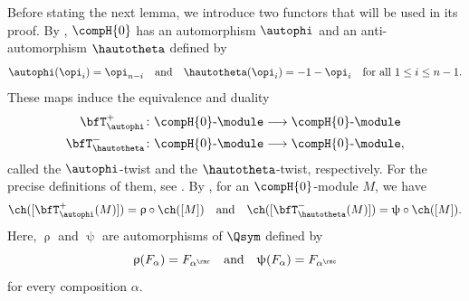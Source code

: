 \documentclass[12pt, reqno]{amsart}
\theoremstyle{plain}
\theoremstyle{definition}
\numberwithin{equation}{section}
\numberwithin{figure}{section}
\numberwithin{table}{section}
\begin{document}
Before stating the next lemma,
we introduce two functors that will be used in its proof.
By \cite[Proposition~3.2]{05Fayers}, $\compH{0}$ has an automorphism
$\autophi$ and an anti-automorphism $\hautotheta$ defined by
\[
\autophi(\opi_i)=\opi_{n-i}
\quad\text{and}\quad
\hautotheta(\opi_i)=-1-\opi_i
\quad\text{for all $1\leq i\leq n-1$}.
\]
These maps induce the equivalence and duality 
\begin{align*}
\bfT_{\autophi}^{+}
& \colon
\compH{0}\text{-}\module\longrightarrow\compH{0}\text{-}\module\\
\bfT_{\hautotheta}^{-}
&\colon
\compH{0}\text{-}\module\longrightarrow\compH{0}\text{-}\module,
\end{align*}
called the $\autophi$-twist and the $\hautotheta$-twist, respectively.
For the precise definitions of them, see \cite[Subsection 3.4]{22JKLO}.
By \cite[Proposition~3.3]{05Fayers}, for an $\compH{0}$-module $M$, we have
\begin{align}\label{eq: same characteristic and twist}
\ch([\bfT^{+}_{\autophi}(M)]) = \uprho \circ \ch([M]) \quad\text{and}\quad \ch([\bfT^{-}_{\hautotheta}(M)]) = \uppsi \circ \ch([M]).
\end{align}
Here, $\uprho$ and $\uppsi$ are automorphisms of $\Qsym$ defined by
\[
\uprho(F_{\alpha}) = F_{\alpha^\rmr}
\quad\text{and}\quad
\uppsi(F_{\alpha}) = F_{\alpha^\rmc}
\]
for every composition $\alpha$.
\end{document}
